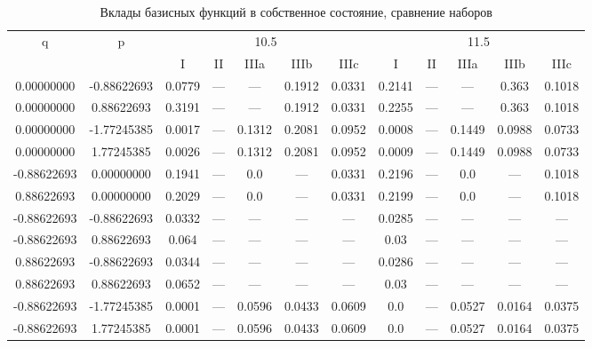 \documentclass[a4paper,14pt]{extarticle}
\begin{document}
\begin{landscape}
\begin{table}[H]
\centering
\caption{Вклады базисных функций в собственное состояние, сравнение наборов}
\begin{tabular}{|c|c|*{5}{c}|*{5}{c}|}
\hline
\multirow{2}{*}{q} & \multirow{2}{*}{p} & \multicolumn{5}{|c|}{10.5}                  & \multicolumn{5}{|c|}{11.5}                  \\
\cline{3-12}
                   &                    & I      & II     & IIIa   & IIIb   & IIIc   & I      & II     & IIIa   & IIIb   & IIIc   \\ 
\hline
 0.00000000        & -0.88622693        & 0.0779 & ---    & ---    & 0.1912 & 0.0331 & 0.2141 & ---    & ---    & 0.363  & 0.1018 \\ 
 0.00000000        &  0.88622693        & 0.3191 & ---    & ---    & 0.1912 & 0.0331 & 0.2255 & ---    & ---    & 0.363  & 0.1018 \\ 
 0.00000000        & -1.77245385        & 0.0017 & ---    & 0.1312 & 0.2081 & 0.0952 & 0.0008 & ---    & 0.1449 & 0.0988 & 0.0733 \\ 
 0.00000000        &  1.77245385        & 0.0026 & ---    & 0.1312 & 0.2081 & 0.0952 & 0.0009 & ---    & 0.1449 & 0.0988 & 0.0733 \\ 
-0.88622693        &  0.00000000        & 0.1941 & ---    & 0.0    & ---    & 0.0331 & 0.2196 & ---    & 0.0    & ---    & 0.1018 \\ 
 0.88622693        &  0.00000000        & 0.2029 & ---    & 0.0    & ---    & 0.0331 & 0.2199 & ---    & 0.0    & ---    & 0.1018 \\ 
-0.88622693        & -0.88622693        & 0.0332 & ---    & ---    & ---    & ---    & 0.0285 & ---    & ---    & ---    & ---    \\ 
-0.88622693        &  0.88622693        & 0.064  & ---    & ---    & ---    & ---    & 0.03   & ---    & ---    & ---    & ---    \\ 
 0.88622693        & -0.88622693        & 0.0344 & ---    & ---    & ---    & ---    & 0.0286 & ---    & ---    & ---    & ---    \\ 
 0.88622693        &  0.88622693        & 0.0652 & ---    & ---    & ---    & ---    & 0.03   & ---    & ---    & ---    & ---    \\ 
-0.88622693        & -1.77245385        & 0.0001 & ---    & 0.0596 & 0.0433 & 0.0609 & 0.0    & ---    & 0.0527 & 0.0164 & 0.0375 \\ 
-0.88622693        &  1.77245385        & 0.0001 & ---    & 0.0596 & 0.0433 & 0.0609 & 0.0    & ---    & 0.0527 & 0.0164 & 0.0375 \\ 

\end{tabular}
\end{table}
\end{landscape}
\end{document}

